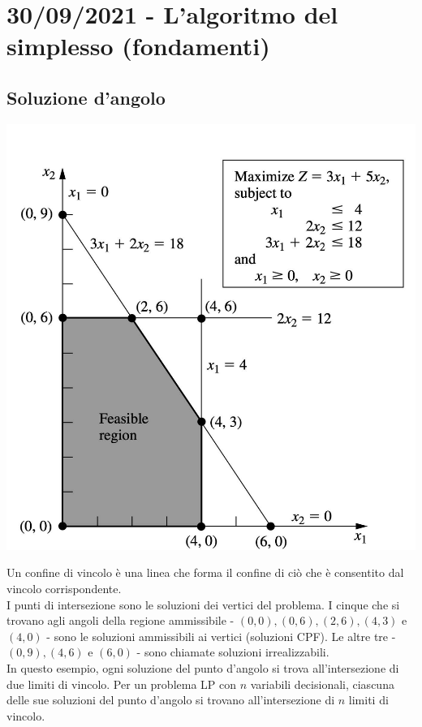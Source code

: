 \documentclass[12pt,a4paper]{article}
\begin{document}
\section{30/09/2021 - L'algoritmo del simplesso (fondamenti)}
\subsection{Soluzione d'angolo}
\begin{center}
\includegraphics[width=0.4\columnwidth]{img/es210927.jpg}
\end{center}
Un confine di vincolo è una linea che forma il confine di ciò che è consentito dal vincolo corrispondente.\\
I punti di intersezione sono le soluzioni dei vertici del problema. I cinque che si trovano agli angoli della regione ammissibile - $(0, 0), (0, 6), (2, 6), (4, 3)$ e $(4, 0)$ - sono le soluzioni ammissibili ai vertici (soluzioni CPF). Le altre tre - $(0, 9), (4, 6)$ e $(6, 0)$ - sono chiamate
soluzioni irrealizzabili.\\
In questo esempio, ogni soluzione del punto d'angolo si trova all'intersezione di due limiti di vincolo. Per un problema LP con $n$ variabili decisionali, ciascuna delle sue soluzioni del punto d'angolo si trovano all'intersezione di $n$ limiti di vincolo.
\end{document}
